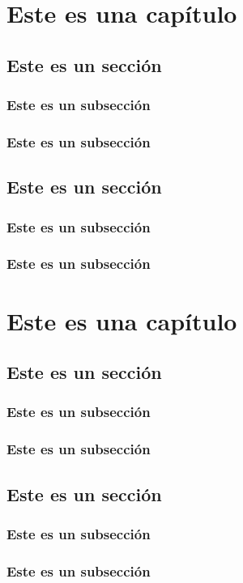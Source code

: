 \documentclass[11pt,oneside]{book}
\begin{document}
\begin{appendices}
\chapter{Este es una capítulo}
\section{Este es un sección}
\subsection{Este es un subsección}
\lipsum[1-3]

\subsection{Este es un subsección}
\lipsum[1-2]

\section{Este es un sección}
\subsection{Este es un subsección}
\lipsum[1-1]
\subsection{Este es un subsección}
\lipsum[1-2]

\chapter{Este es una capítulo}
\section{Este es un sección}
\subsection{Este es un subsección}
\lipsum[1-3]

\subsection{Este es un subsección}
\lipsum[1-2]

\section{Este es un sección}
\subsection{Este es un subsección}
\lipsum[1-1]
\subsection{Este es un subsección}
\lipsum[1-2]


\end{appendices}
\end{document}
